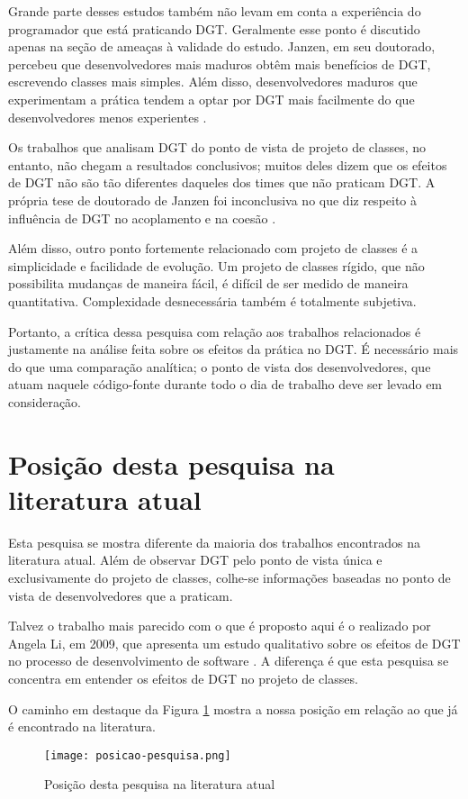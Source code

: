 Grande parte desses estudos também não levam em conta a experiência do
programador que está praticando DGT. Geralmente esse ponto é discutido apenas 
na seção de ameaças à validade do estudo. Janzen, em seu doutorado, percebeu que
desenvolvedores mais maduros obtêm mais benefícios de DGT, escrevendo classes
mais simples. Além disso, desenvolvedores maduros que experimentam a prática
tendem a optar por DGT mais facilmente do que desenvolvedores menos experientes
\cite{janzen-phd}.

Os trabalhos que analisam DGT do ponto de vista de projeto de classes, no entanto, não
chegam a resultados conclusivos; muitos deles dizem que os efeitos
de DGT não são tão diferentes daqueles dos times que não praticam DGT.  A própria tese de
doutorado de Janzen foi inconclusiva no que diz respeito à influência de DGT no 
acoplamento e na coesão \cite{janzen-phd}. 

Além disso, outro ponto fortemente relacionado com projeto de classes é a simplicidade e
facilidade de evolução. Um projeto de classes rígido, que não possibilita mudanças de maneira
fácil, é difícil de ser medido de maneira quantitativa. Complexidade
desnecessária também é totalmente subjetiva. 

Portanto, a crítica dessa pesquisa
com relação aos trabalhos relacionados é justamente na análise feita sobre os
efeitos da prática no DGT. É necessário mais do que uma comparação analítica; o
ponto de vista dos desenvolvedores, que atuam naquele código-fonte durante todo
o dia de trabalho deve ser levado em consideração.

\section{Posição desta pesquisa na literatura atual}

Esta pesquisa se mostra diferente da maioria dos trabalhos encontrados na
literatura atual. Além de observar DGT pelo ponto de vista única e
exclusivamente do projeto de classes, colhe-se informações baseadas no ponto de
vista de desenvolvedores que a praticam.

Talvez o trabalho mais parecido com o que é proposto aqui é o
realizado por Angela Li, em 2009, que apresenta um estudo qualitativo sobre os
efeitos de DGT no processo de desenvolvimento de software \cite{angela-li}. 
A diferença é que esta pesquisa se concentra em entender os
efeitos de DGT no projeto de classes.

O caminho em destaque da Figura \ref{fig:posicao-pesquisa} mostra a nossa posição
em relação ao que já é encontrado na literatura.

\begin{figure}[h!]
  \centering
  \texttt{[image: posicao-pesquisa.png]}
  \caption{Posição desta pesquisa na literatura atual}
  \label{fig:posicao-pesquisa}
\end{figure}

